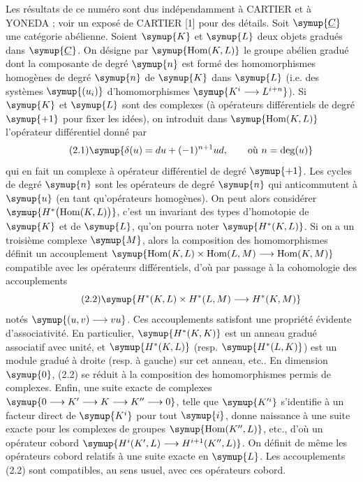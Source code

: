 Les résultats de ce numéro sont dus indépendamment à CARTIER et à YONEDA ; voir
un exposé de CARTIER [1] pour des détails. Soit $\symup{\underline{C}}$ une catégorie abélienne.
Soient $\symup{K}$ et $\symup{L}$ deux objets gradués dans $\symup{\underline{C}}$. On désigne par
$\symup{\operatorname{Hom}(K,L)}$ le groupe abélien gradué dont la composante de degré
$\symup{n}$ est formé des homomorphismes homogènes de degré $\symup{n}$ de $\symup{K}$ dans $\symup{L}$ (i.e.
des systèmes $\symup{(u_i)}$ d'homomorphismes $\symup{K^{i}\longrightarrow L^{i+n}}$).
Si $\symup{K}$ et $\symup{L}$ sont des complexes (à opérateurs différentiels de degré $\symup{+1}$ pour
fixer les idées), on introduit dans $\symup{\operatorname{Hom}(K,L)}$ l'opérateur
différentiel donné par
\begin{equation}\tag{2.1}
  \symup{\delta(u)=du+(-1)^{n+1}ud,\qquad\text{où }n=\deg(u)}
\end{equation}
qui en fait un complexe à opérateur différentiel de degré $\symup{+1}$. Les cycles de
degré $\symup{n}$ sont les opérateurs de degré $\symup{n}$ qui anticommutent à $\symup{u}$ (en tant
qu'opérateurs homogènes). On peut alors considérer
$\symup{H^{*}\bigl(\operatorname{Hom}(K,L)\bigr)}$, c'est un invariant des types
d'homotopie de $\symup{K}$ et de $\symup{L}$, qu'on pourra noter $\symup{H^{*}(K,L)}$.
Si on a un troisième complexe $\symup{M}$, alors la composition des homomorphismes
définit un accouplement
$\symup{\operatorname{Hom}(K,L)\times\operatorname{Hom}(L,M)
\longrightarrow\operatorname{Hom}(K,M)}$ compatible avec les opérateurs différentiels, d'où par passage à la cohomologie
des accouplements
\begin{equation}\tag{2.2}
  \symup{H^{*}(K,L)\times H^{*}(L,M)\longrightarrow H^{*}(K,M)}
\end{equation}
notés $\symup{(u,v)\longrightarrow vu}$. Ces accouplements satisfont une propriété évidente
d'associativité. En particulier, $\symup{H^{*}(K,K)}$ est un anneau gradué associatif
avec unité, et $\symup{H^{*}(K,L)}$ (resp. $\symup{H^{*}(L,K)}$) est un module gradué à droite
(resp. à gauche) sur cet anneau, etc.. En dimension $\symup{0}$, (2.2) se réduit à la
composition des homomorphismes permis de complexes. Enfin, une suite exacte de
complexes
$\symup{0\longrightarrow K'\longrightarrow K\longrightarrow K''\longrightarrow 0}$, telle que $\symup{K'^{i}}$ s'identifie à un facteur direct de $\symup{K^{i}}$ pour tout $\symup{i}$,
donne naissance à une suite exacte pour les complexes de groupes
$\symup{\operatorname{Hom}(K'',L)}$, etc., d'où un opérateur cobord
$\symup{H^{i}(K',L)\longrightarrow H^{i+1}(K'',L)}$.
On définit de même les opérateurs cobord relatifs à une suite exacte en $\symup{L}$. Les
accouplements (2.2) sont compatibles, au sens usuel, avec ces opérateurs cobord.

